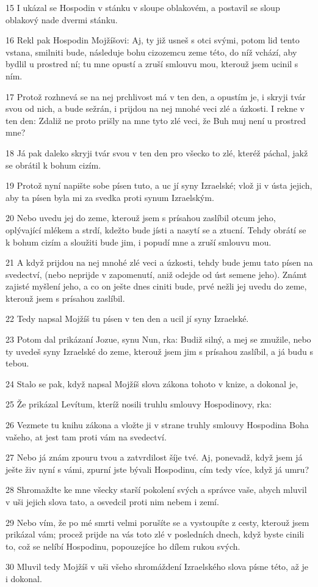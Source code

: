 \par 15 I ukázal se Hospodin v stánku v sloupe oblakovém, a postavil se sloup oblakový nade dvermi stánku.
\par 16 Rekl pak Hospodin Mojžíšovi: Aj, ty již usneš s otci svými, potom lid tento vstana, smilniti bude, následuje bohu cizozemcu zeme této, do níž vchází, aby bydlil u prostred ní; tu mne opustí a zruší smlouvu mou, kterouž jsem ucinil s ním.
\par 17 Protož rozhnevá se na nej prchlivost má v ten den, a opustím je, i skryji tvár svou od nich, a bude sežrán, i prijdou na nej mnohé veci zlé a úzkosti. I rekne v ten den: Zdaliž ne proto prišly na mne tyto zlé veci, že Buh muj není u prostred mne?
\par 18 Já pak daleko skryji tvár svou v ten den pro všecko to zlé, kteréž páchal, jakž se obrátil k bohum cizím.
\par 19 Protož nyní napište sobe písen tuto, a uc jí syny Izraelské; vlož ji v ústa jejich, aby ta písen byla mi za svedka proti synum Izraelským.
\par 20 Nebo uvedu jej do zeme, kterouž jsem s prísahou zaslíbil otcum jeho, oplývající mlékem a strdí, kdežto bude jísti a nasytí se a ztucní. Tehdy obrátí se k bohum cizím a sloužiti bude jim, i popudí mne a zruší smlouvu mou.
\par 21 A když prijdou na nej mnohé zlé veci a úzkosti, tehdy bude jemu tato písen na svedectví, (nebo neprijde v zapomenutí, aniž odejde od úst semene jeho). Známt zajisté myšlení jeho, a co on ješte dnes ciniti bude, prvé nežli jej uvedu do zeme, kterouž jsem s prísahou zaslíbil.
\par 22 Tedy napsal Mojžíš tu písen v ten den a ucil jí syny Izraelské.
\par 23 Potom dal prikázaní Jozue, synu Nun, rka: Budiž silný, a mej se zmužile, nebo ty uvedeš syny Izraelské do zeme, kterouž jsem jim s prísahou zaslíbil, a já budu s tebou.
\par 24 Stalo se pak, když napsal Mojžíš slova zákona tohoto v knize, a dokonal je,
\par 25 Že prikázal Levítum, kteríž nosili truhlu smlouvy Hospodinovy, rka:
\par 26 Vezmete tu knihu zákona a vložte ji v strane truhly smlouvy Hospodina Boha vašeho, at jest tam proti vám na svedectví.
\par 27 Nebo já znám zpouru tvou a zatvrdilost šíje tvé. Aj, ponevadž, když jsem já ješte živ nyní s vámi, zpurní jste bývali Hospodinu, cím tedy více, když já umru?
\par 28 Shromaždte ke mne všecky starší pokolení svých a správce vaše, abych mluvil v uši jejich slova tato, a osvedcil proti nim nebem i zemí.
\par 29 Nebo vím, že po mé smrti velmi porušíte se a vystoupíte z cesty, kterouž jsem prikázal vám; procež prijde na vás toto zlé v posledních dnech, když byste cinili to, což se nelíbí Hospodinu, popouzejíce ho dílem rukou svých.
\par 30 Mluvil tedy Mojžíš v uši všeho shromáždení Izraelského slova písne této, až je i dokonal.

